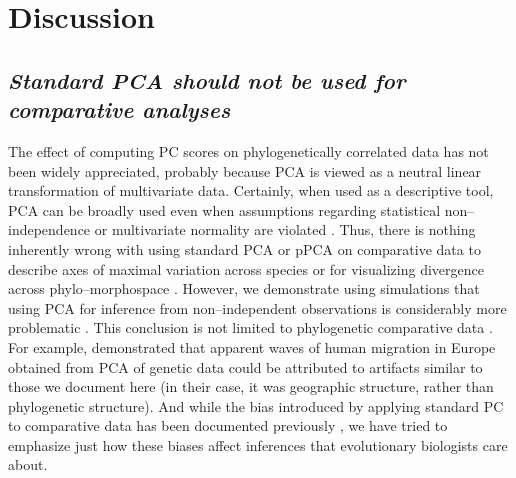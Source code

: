 \documentclass[a4paper,12pt]{article}
\begin{document}

\section{Discussion}
\subsection{\emph{Standard PCA should not be used for comparative analyses}} 

The effect of computing PC scores on phylogenetically correlated data has not been widely appreciated, probably because PCA is viewed as a neutral linear transformation of multivariate data. Certainly, when used as a descriptive tool, PCA can be broadly used even when assumptions regarding statistical non--independence or multivariate normality are violated \citep{Jolliffe2002}. Thus, there is nothing inherently wrong with using standard PCA or pPCA on comparative data to describe axes of maximal variation across species or for visualizing divergence across phylo--morphospace \citep{Sidlauskas2008}. However, we demonstrate using simulations that using PCA for inference from non--independent observations is considerably more problematic \citep{Jolliffe2002}. This conclusion is not limited to phylogenetic comparative data \citep[see][]{Richman1986, Podani2002, Novembre, Bookstein2012}. For example, \citet{Novembre} demonstrated that apparent waves of human migration in Europe obtained from PCA of genetic data \citep[e.g.,][]{Cavalli} could be attributed to artifacts similar to those we document here (in their case, it was geographic structure, rather than phylogenetic structure). And while the bias introduced by applying standard PC to comparative data has been documented previously \citep{Revell2008, Polly2013}, we have tried to emphasize just how these biases affect inferences that evolutionary biologists care about.
\end{document}
